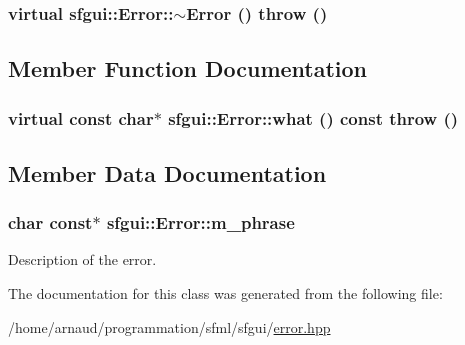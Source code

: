 \hypertarget{classsfgui_1_1Error_fb2a732879909cf082f89002c0f03981}{
\subsubsection[$\sim$Error]{\setlength{\rightskip}{0pt plus 5cm}virtual sfgui::Error::$\sim$Error ()  throw ()}}
\label{classsfgui_1_1Error_fb2a732879909cf082f89002c0f03981}




\subsection{Member Function Documentation}
\hypertarget{classsfgui_1_1Error_7e169ba3f26b7585d292bec5a253b8ec}{
\subsubsection[what]{\setlength{\rightskip}{0pt plus 5cm}virtual const char$\ast$ sfgui::Error::what () const  throw ()}}
\label{classsfgui_1_1Error_7e169ba3f26b7585d292bec5a253b8ec}




\subsection{Member Data Documentation}
\hypertarget{classsfgui_1_1Error_2acba2e2ab334cd94bf392f26f9207ff}{
\subsubsection[m\_\-phrase]{\setlength{\rightskip}{0pt plus 5cm}char const$\ast$ {\bf sfgui::Error::m\_\-phrase}}}
\label{classsfgui_1_1Error_2acba2e2ab334cd94bf392f26f9207ff}


Description of the error. 



The documentation for this class was generated from the following file:\begin{CompactItemize}
\item 
/home/arnaud/programmation/sfml/sfgui/\hyperlink{error_8hpp}{error.hpp}\end{CompactItemize}
